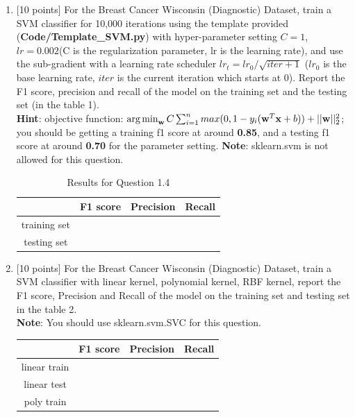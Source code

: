 \documentclass[letterpaper]{article}
\def\argmin{\mathop{\text{arg\,min}}}
\begin{document}
\begin{enumerate}
  \item {[10 points]} For the Breast Cancer Wisconsin (Diagnostic) Dataset, train a SVM classifier for 10,000 iterations using the template provided (\textbf{Code/Template\_SVM.py}) with hyper-parameter setting $C=1$, $lr=0.002$(C is the regularization parameter, lr is the learning rate), and use the sub-gradient with a learning rate scheduler $lr_t = lr_0/\sqrt{iter+1}$ ($lr_0$ is the base learning rate, $iter$ is the current iteration which starts at 0). Report the F1 score, precision and recall of the model on the training set and the testing set (in the table 1).\\
  \textbf{Hint}: objective function: $\argmin_{\mathbf{w}}C\sum_{i=1}^{n} max(0, 1-y_i(\mathbf{w}^{T}\mathbf{x}+b)) + ||\mathbf{w}||_2^2 $; you should be getting a training f1 score at around \textbf{0.85}, and a testing f1 score at around \textbf{0.70} for the parameter setting. 
  \textbf{Note}: sklearn.svm is not allowed for this question. \\
    \begin{table}[H]
    \centering
    \begin{tabular}{|c|c|c|c|}
    \hline
                    & F1 score         & Precision         & Recall    \\
    \hline
     training set   &  &   & \\
    \hline
     testing set    &  &   & \\
    \hline
    \end{tabular}
    \caption{Results for Question 1.4}
    \end{table}
\item {[10 points]} For the Breast Cancer Wisconsin (Diagnostic) Dataset, train a SVM classifier with linear kernel, polynomial kernel, RBF kernel, report the F1 score, Precision and Recall of the model on the training set and testing set in the table 2.\\
  \textbf{Note}: You should use sklearn.svm.SVC for this question.\\
    \begin{table}[H]
    \centering
    \begin{tabular}{|c|c|c|c|}
    \hline
                    & F1 score       & Precision      & Recall    \\
    \hline
     linear train   &  &  & \\
    \hline
     linear test    &  &  & \\
    \hline
     poly   train   &  &  & \\

\end{tabular}
\end{table}
\end{enumerate}
\end{document}
